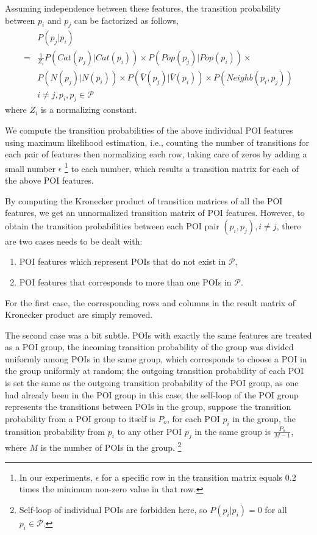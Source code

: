 Assuming independence between these features,
the transition probability between $p_i$ and $p_j$ can be factorized as follows,
\begin{align*}
    & P(p_j | p_i) \\
   =& \frac{1}{Z_i} P(Cat(p_j) | Cat(p_i)) \times P(Pop(p_j) | Pop(p_i)) \times \\
    & P(N(p_j) | N(p_i)) \times P(\bar{V}(p_j) | \bar{V}(p_i)) \times P(Neighb(p_i, p_j)) \\
    & i \ne j, p_i, p_j \in \mathcal{P}
\end{align*}
where $Z_i$ is a normalizing constant.


We compute the transition probabilities of the above individual POI features 
using maximum likelihood estimation, 
i.e., counting the number of transitions for each pair of features then normalizing each row,
taking care of zeros by adding a small number $\epsilon$
\footnote{In our experiments, $\epsilon$ for a specific row in the transition matrix equals $0.2$ times 
the minimum non-zero value in that row.}
to each number,
which results a transition matrix for each of the above POI features.

By computing the Kronecker product of transition matrices of all the POI features,
we get an unnormalized transition matrix of POI features.
However, to obtain the transition probabilities between each POI pair $(p_i, p_j), i \ne j$,
there are two cases needs to be dealt with:
\begin{enumerate}
\item POI features which represent POIs that do not exist in $\mathcal{P}$,
\item POI features that corresponds to more than one POIs in $\mathcal{P}$.
\end{enumerate}

For the first case, 
the corresponding rows and columns in the result matrix of Kronecker product are simply removed.

The second case was a bit subtle.
POIs with exactly the same features are treated as a POI group,
the incoming transition probability of the group was divided uniformly among POIs in the same group,
which corresponds to choose a POI in the group uniformly at random;
the outgoing transition probability of each POI is set the same as the outgoing transition probability of the POI group,
as one had already been in the POI group in this case;
the self-loop of the POI group represents the transitions between POIs in the group,
suppose the transition probability from a POI group to itself is $P_o$,
for each POI $p_i$ in the group, the transition probability from $p_i$ to any other POI $p_j$ in the same group
is $\frac{P_o}{M-1}$, where $M$ is the number of POIs in the group.
\footnote{Self-loop of individual POIs are forbidden here, so $P(p_i | p_i) = 0$ for all $p_i \in \mathcal{P}$.}

